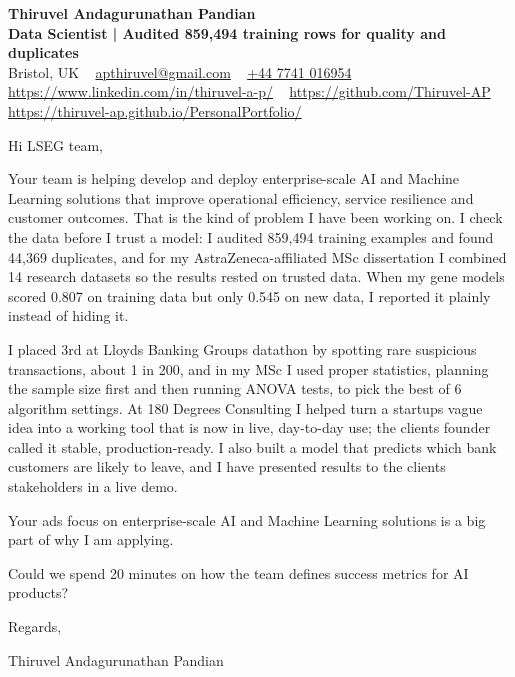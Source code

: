 \documentclass[11pt,a4paper]{article}
\newcommand{\num}[1]{\textbf{#1}}   %
\begin{document}
\raggedright
\pagestyle{empty}

\begin{center}
    {\LARGE \color{linkblue} \textbf{Thiruvel Andagurunathan Pandian}}\\[0.2cm]
    {\color{headernavy}\small\textbf{Data Scientist | Audited \num{859,494} training rows for quality and duplicates}}\\[0.2cm]
    {\small Bristol, UK\nobreak\ \,\textbar\, \href{mailto:apthiruvel@gmail.com}{apthiruvel@gmail.com}\nobreak\ \,\textbar\, \href{tel:+447741016954}{+44 7741 016954}\nobreak\ \,\textbar\, \href{https://www.linkedin.com/in/thiruvel-a-p/}{https://www.linkedin.com/in/thiruvel-a-p/}\nobreak\ \,\textbar\, \href{https://github.com/Thiruvel-AP}{https://github.com/Thiruvel-AP}\nobreak\ \,\textbar\, \href{https://thiruvel-ap.github.io/PersonalPortfolio/}{https://thiruvel-ap.github.io/PersonalPortfolio/}}

\end{center}

\vspace{0.4cm}

\noindent
Hi LSEG team,

Your team is helping develop and deploy enterprise-scale AI and Machine Learning solutions that improve operational efficiency, service resilience and customer outcomes. That is the kind of problem I have been working on. I check the data before I trust a model: I audited 859,494 training examples and found 44,369 duplicates, and for my AstraZeneca-affiliated MSc dissertation I combined 14 research datasets so the results rested on trusted data. When my gene models scored 0.807 on training data but only 0.545 on new data, I reported it plainly instead of hiding it.

I placed 3rd at Lloyd\textquotesingle{}s Banking Group\textquotesingle{}s datathon by spotting rare suspicious transactions, about 1 in 200, and in my MSc I used proper statistics, planning the sample size first and then running ANOVA tests, to pick the best of 6 algorithm settings. At 180 Degrees Consulting I helped turn a startup\textquotesingle{}s vague idea into a working tool that is now in live, day-to-day use; the client\textquotesingle{}s founder called it \textquotedbl{}stable, production-ready\textquotedbl{}. I also built a model that predicts which bank customers are likely to leave, and I have presented results to the client\textquotesingle{}s stakeholders in a live demo.

Your ad\textquotesingle{}s focus on enterprise-scale AI and Machine Learning solutions is a big part of why I am applying.

Could we spend 20 minutes on how the team defines success metrics for AI products?

\vspace{0.5cm}

Regards,

Thiruvel Andagurunathan Pandian
\end{document}
